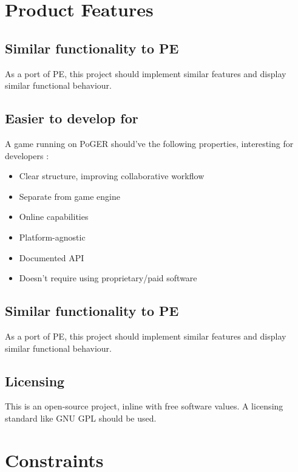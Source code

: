 \documentclass[11pt]{article}
\begin{document}
\newpage
\section{Product Features}

\subsection{Similar functionality to PE}

As a port of PE, this project should implement similar features and display similar functional behaviour.

\subsection{Easier to develop for}

A game running on PoGER should've the following properties, interesting for developers :
\begin{itemize}
	\item Clear structure, improving collaborative workflow
	\item Separate from game engine
	\item Online capabilities
	\item Platform-agnostic
	\item Documented API
	\item Doesn't require using proprietary/paid software
\end{itemize}

\subsection{Similar functionality to PE}

As a port of PE, this project should implement similar features and display similar functional behaviour.

\subsection{Licensing}

This is an open-source project, inline with free software values. A licensing standard like GNU GPL should be used.













\newpage 
\section{Constraints}
\end{document}
